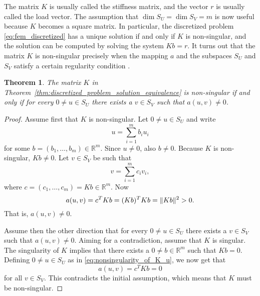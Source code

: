 \documentclass[english, 12pt, a4paper, sci, utf8, a-2b, online]{aaltothesis}
\theoremstyle{definition}
\theoremstyle{plain}
\newtheorem{theorem}{Theorem}[section]
\DeclarePairedDelimiter\norm{\lVert}{\rVert}
\numberwithin{equation}{section}
\begin{document}
The matrix $K$ is usually called the stiffness matrix, and
the vector $r$ is usually called the load vector.
The assumption that $\dim S_U = \dim S_V = m$ is now useful
because $K$ becomes a square matrix.
In particular, the discretized problem \eqref{eq:fem_discretized}
has a unique solution if and only if $K$ is non-singular,
and the solution can be computed by solving the system $Kb=r$.
It turns out that the matrix $K$ is non-singular
precisely when the mapping $a$ and the subspaces $S_U$ and $S_V$
satisfy a certain regularity condition \cite{schwab1998}.
\begin{theorem}
    \label{thm:nonsingularity_of_K}
    The matrix $K$ in Theorem~\ref{thm:discretized_problem_solution_equivalence}
    is non-singular if and only if for every
    $0 \neq u \in S_U$ there exists a $v \in S_V$ such that $a(u,v) \neq 0$.
\end{theorem}
\begin{proof}
    Assume first that $K$ is non-singular.
    Let $0 \neq u \in S_U$ and write
    \begin{equation}
        \label{eq:nonsingularity_of_K_u}
        u = \sum_{i=1}^{m} b_i u_i
    \end{equation}
    for some $b = (b_1,\dotsc,b_m) \in \mathbb{R}^m$.
    Since $u \neq 0$, also $b \neq 0$.
    Because $K$ is non-singular, $Kb \neq 0$.
    Let $v \in S_V$ be such that
    \begin{equation*}
        v = \sum_{i=1}^{m} c_i v_i,
    \end{equation*}
    where $c = (c_1,\dotsc,c_m) = Kb \in \mathbb{R}^m$. Now
    \begin{equation*}
        a(u,v) = c^T Kb = (Kb)^T Kb = \norm{Kb}^2 > 0.
    \end{equation*}
    That is, $a(u,v) \neq 0$.

    Assume then the other direction that for every
    $0 \neq u \in S_U$ there exists a $v \in S_V$ such that $a(u,v) \neq 0$.
    Aiming for a contradiction, assume that $K$ is singular.
    The singularity of $K$ implies that
    there exists a $0 \neq b \in \mathbb{R}^m$ such that $Kb = 0$.
    Defining $0 \neq u \in S_U$ as in \eqref{eq:nonsingularity_of_K_u},
    we now get that
    \begin{equation*}
        a(u,v) = c^T Kb = 0
    \end{equation*}
    for all $v \in S_V$.
    This contradicts the initial assumption, which means that $K$
    must be non-singular.
\end{proof}
\end{document}
